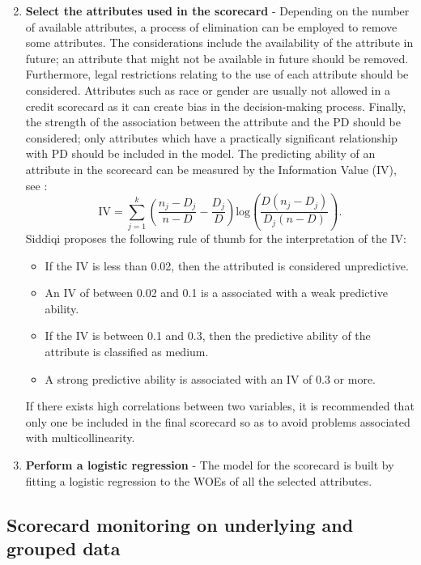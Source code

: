 \documentclass{article}
\theoremstyle{def}
\begin{document}
\begin{enumerate}
\begin{equation*}
\end{equation*}
    \item \textbf{Select the attributes used in the scorecard} - Depending on the number of available attributes, a process of elimination can be employed to remove some attributes. The considerations include the availability of the attribute in future; an attribute that might not be available in future should be removed. Furthermore, legal restrictions relating to the use of each attribute should be considered. Attributes such as race or gender are usually not allowed in a credit scorecard as it can create bias in the decision-making process.  Finally, the strength of the association between the attribute and the PD should be considered; only attributes which have a practically significant relationship with PD should be included in the model. The predicting ability of an attribute in the scorecard can be measured by the Information Value (IV), see \cite{SIDDIQI2006}:
\begin{equation*}
    \textrm{IV}=\sum_{j=1}^k \left(\frac{n_j-D_j}{n-D} - \frac{D_j}{D}\right) \textrm{log}\left(\frac{D(n_j-D_j)}{D_j(n-D)}\right).
\end{equation*}
    Siddiqi \cite{SIDDIQI2006} proposes the following rule of thumb for the interpretation of the IV:
    \begin{itemize}
    \item If the IV is less than 0.02, then the attributed is considered unpredictive.
    \item An IV of between 0.02 and 0.1 is a associated with a weak predictive ability.
    \item If the IV is between 0.1 and 0.3, then the predictive ability of the attribute is classified as medium.
    \item A strong predictive ability is associated with an IV of 0.3 or more.
    \end{itemize}
    If there exists high correlations between two variables, it is recommended that only one be included in the final scorecard so as to avoid problems associated with multicollinearity.
    \item \textbf{Perform a logistic regression} - The model for the scorecard is built by fitting a logistic regression to the WOEs of all the selected attributes.
\end{enumerate}

\subsection{Scorecard monitoring on underlying and grouped data}
\end{document}
